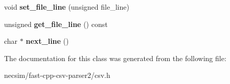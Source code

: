 \begin{DoxyCompactItemize}
\item 
void {\bfseries set\+\_\+file\+\_\+line} (unsigned file\+\_\+line)\hypertarget{classio_1_1_line_reader_a581b55d4ced6adb964de50fa8ac6eb08}{}\label{classio_1_1_line_reader_a581b55d4ced6adb964de50fa8ac6eb08}

\item 
unsigned {\bfseries get\+\_\+file\+\_\+line} () const \hypertarget{classio_1_1_line_reader_ae043da5b943a08601246c7e3420fd126}{}\label{classio_1_1_line_reader_ae043da5b943a08601246c7e3420fd126}

\item 
char $\ast$ {\bfseries next\+\_\+line} ()\hypertarget{classio_1_1_line_reader_a97f4e0129611d9da2b8c966ffe670be5}{}\label{classio_1_1_line_reader_a97f4e0129611d9da2b8c966ffe670be5}

\end{DoxyCompactItemize}


The documentation for this class was generated from the following file\+:\begin{DoxyCompactItemize}
\item 
necsim/fast-\/cpp-\/csv-\/parser2/csv.\+h\end{DoxyCompactItemize}
